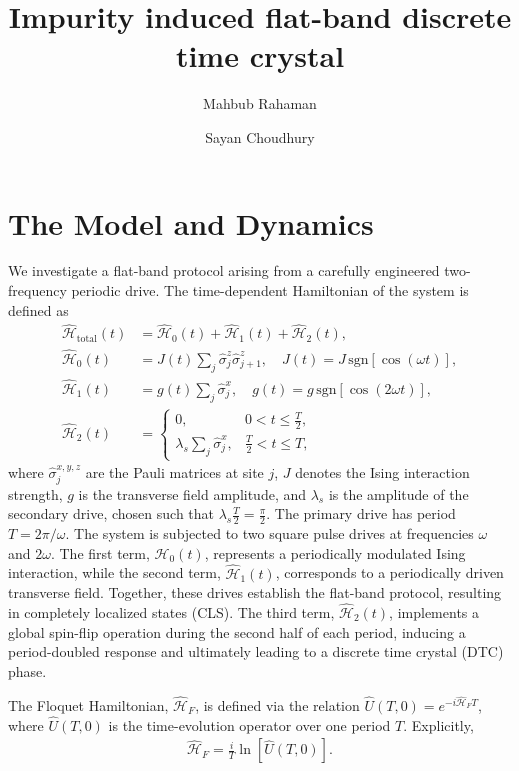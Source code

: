 \documentclass[a4paper, 10pt]{article}
\title{Impurity induced flat-band discrete time crystal}
\author[1]{Mahbub Rahaman}
\author[1]{Sayan Choudhury}
\affil[1]{\small Harish-Chandra Research Institute, HBNI, Chhatnag Road, Jhunsi, Praygraj, UP - 211019, India}
\date{}
\begin{document}
\maketitle

\section{The Model and Dynamics}
We investigate a flat-band protocol arising from a carefully engineered two-frequency periodic drive. The time-dependent Hamiltonian of the system is defined as
\begin{align}
    \hat{\mathcal{H}}_{\text{total}}(t) &=  \hat{\mathcal{H}}_0(t) + \hat{\mathcal{H}}_1(t)  + \hat{\mathcal{H}}_2(t), \\
    \hat{\mathcal{H}}_0(t) &= J(t)\sum_{j} \hat{\sigma}_j^z \hat{\sigma}_{j+1}^z, \quad J(t) = J\, \mathrm{sgn}[\cos(\omega t)], \\
    \hat{\mathcal{H}}_1(t) &= g(t)\sum_{j}\hat{\sigma}_j^x, \quad g(t) = g\, \mathrm{sgn}[\cos(2 \omega t)], \\
    \hat{\mathcal{H}}_2(t) &=
    \begin{cases}
        0, & 0 < t \leq \frac{T}{2}, \\
        \lambda_s \sum_{j}\hat{\sigma}_j^x, & \frac{T}{2} < t \leq T,
    \end{cases}
\end{align}
where $\hat{\sigma}_j^{x,y,z}$ are the Pauli matrices at site $j$, $J$ denotes the Ising interaction strength, $g$ is the transverse field amplitude, and $\lambda_s$ is the amplitude of the secondary drive, chosen such that $\lambda_s \frac{T}{2} = \frac{\pi}{2}$. The primary drive has period $T = 2\pi/\omega$. The system is subjected to two square pulse drives at frequencies $\omega$ and $2\omega$. The first term, $\hat{\mathcal{H}}_0(t)$, represents a periodically modulated Ising interaction, while the second term, $\hat{\mathcal{H}}_1(t)$, corresponds to a periodically driven transverse field. Together, these drives establish the flat-band protocol, resulting in completely localized states (CLS). The third term, $\hat{\mathcal{H}}_2(t)$, implements a global spin-flip operation during the second half of each period, inducing a period-doubled response and ultimately leading to a discrete time crystal (DTC) phase.

The Floquet Hamiltonian, $\hat{\mathcal{H}}_F$, is defined via the relation $\hat{U}(T,0) = e^{-i \hat{\mathcal{H}}_F T}$, where $\hat{U}(T,0)$ is the time-evolution operator over one period $T$. Explicitly,
\begin{align}
    \hat{\mathcal{H}}_F = \frac{i}{T} \ln[\hat{U}(T,0)].
\end{align}
\end{document}

